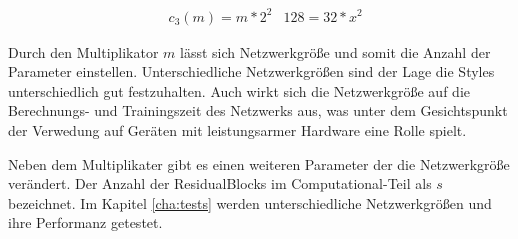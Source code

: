 \begin{align}
	& c_{3}(m) = m * 2^{2}
	& 128 = 32 * x^{2}
\end{align}

Durch den Multiplikator $ m $ lässt sich Netzwerkgröße und somit die Anzahl der Parameter einstellen. Unterschiedliche Netzwerkgrößen sind der Lage die Styles unterschiedlich gut festzuhalten. Auch wirkt sich die Netzwerkgröße auf die Berechnungs- und Trainingszeit des Netzwerks aus, was unter dem Gesichtspunkt der Verwedung auf Geräten mit leistungsarmer Hardware eine Rolle spielt.

Neben dem Multiplikater gibt es einen weiteren Parameter der die Netzwerkgröße verändert. Der Anzahl der ResidualBlocks im Computational-Teil als $ s $ bezeichnet. Im Kapitel \ref{cha:tests} werden unterschiedliche Netzwerkgrößen und ihre Performanz getestet.